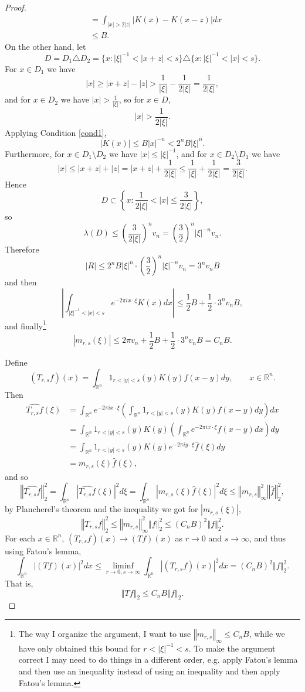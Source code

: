 \documentclass{article}
\newcommand{\norm}[1]{\left\Vert #1 \right\Vert}
\theoremstyle{definition}
\begin{document}
\begin{proof}
\begin{align*}
&=\int_{|x|>2|z|} |K(x)-K(x-z)| dx\\
&\leq B.
\end{align*}
On the other hand, let
\[
D =D_1 \triangle D_2=  \{x:|\xi|^{-1}<|x+z|<s\} \triangle \{x:|\xi|^{-1}<|x|<s\}.
\]
For $x \in D_1$ we have
\[
|x| \geq |x+z| - |z| > \frac{1}{|\xi|} - \frac{1}{2|\xi|}= \frac{1}{2|\xi|},
\]
and for $x \in D_2$ we have
$|x| > \frac{1}{|\xi|}$, so for $x \in D$,
\[
|x| > \frac{1}{2|\xi|}.
\]
Applying Condition \ref{cond1},
\[
|K(x)| \leq B|x|^{-n} < 2^nB|\xi|^n. 
\]
Furthermore, for $x \in D_1 \setminus D_2$ we have $|x| \leq |\xi|^{-1}$, and for $x \in D_2 \setminus D_1$ we have
\[
|x| \leq |x+z|+|z| = |x+z| + \frac{1}{2|\xi|} \leq \frac{1}{|\xi|}+\frac{1}{2|\xi|}
=\frac{3}{2|\xi|}.
\]
Hence
\[
D \subset \left\{x: \frac{1}{2|\xi|} < |x| \leq \frac{3}{2|\xi|}\right\},
\]
so
\[
\lambda(D) \leq \left(\frac{3}{2|\xi|}\right)^n v_n =  \left(\frac{3}{2}\right)^n |\xi|^{-n} v_n.
\]
Therefore
\[
|R| \leq 2^nB|\xi|^n \cdot  \left(\frac{3}{2}\right)^n |\xi|^{-n} v_n
=3^n v_n B
\]
and then
\[
\left| \int_{|\xi|^{-1} < |x|<s} e^{-2\pi ix\cdot \xi} K(x) dx  \right| \leq \frac{1}{2}B + \frac{1}{2} \cdot 3^n v_n B,
\]
and finally\footnote{The way I organize the argument, I want to use $\norm{m_{r,s}}_\infty \leq C_nB$, while
we have only obtained this bound for $r<|\xi|^{-1}<s$. To make the argument correct I may need to 
do things in a different order, e.g. apply Fatou's lemma and then use an inequality instead of using an inequality
and then apply Fatou's lemma.}
\[
|m_{r,s}(\xi)| \leq 2\pi  v_n+\frac{1}{2}B + \frac{1}{2} \cdot 3^n v_n B=C_nB.
\]

Define
\[
(T_{r,s}f)(x) = \int_{\mathbb{R}^n} 1_{r<|y|<s}(y)  K(y) f(x-y) dy,\qquad x \in \mathbb{R}^n.
\]
Then
\begin{align*}
\widehat{T_{r,s}f}(\xi)&=\int_{\mathbb{R}^n} e^{-2\pi ix\cdot \xi} \left( \int_{\mathbb{R}^n} 1_{r<|y|<s}(y)  K(y) f(x-y) dy\right) dx\\
&=\int_{\mathbb{R}^n} 1_{r<|y|<s}(y)  K(y) \left( \int_{\mathbb{R}^n} e^{-2\pi ix\cdot \xi} f(x-y) dx \right) dy\\
&=\int_{\mathbb{R}^n} 1_{r<|y|<s}(y)  K(y) e^{-2\pi iy\cdot \xi} \widehat{f}(\xi) dy\\
&=m_{r,s}(\xi) \widehat{f}(\xi),
\end{align*}
and so
\[
\norm{\widehat{T_{r,s}f}}_2^2=\int_{\mathbb{R}^n} |\widehat{T_{r,s}f}(\xi)|^2 d\xi
=\int_{\mathbb{R}^n} |m_{r,s}(\xi) \widehat{f}(\xi)|^2 d\xi
\leq \norm{m_{r,s}}_\infty^2 \norm{\widehat{f}}_2^2,
\]
by Plancherel's theorem and the inequality we got for $|m_{r,s}(\xi)|$,
\[
\norm{T_{r,s}f}_2^2 \leq \norm{m_{r,s}}_\infty^2 \norm{f}_2^2 \leq (C_nB)^2 \norm{f}_2^2.
\]
For each $x \in \mathbb{R}^n$, 
$(T_{r,s}f)(x) \to (Tf)(x)$ as $r \to 0$ and $s \to \infty$, and thus using Fatou's lemma,
\[
\int_{\mathbb{R}^n} |(Tf)(x)|^2 dx \leq
\liminf_{r \to 0, s \to \infty} \int_{\mathbb{R}^n} |(T_{r,s}f)(x)|^2 dx
=(C_nB)^2 \norm{f}_2^2.
\]
That is,
\[
\norm{Tf}_2 \leq C_nB \norm{f}_2.
\]
\end{proof}
\end{document}
